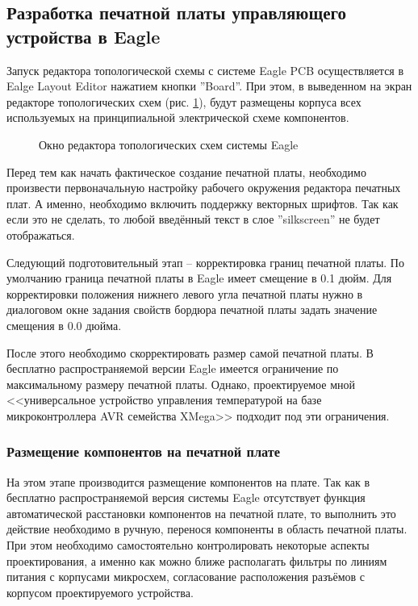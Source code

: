 \subsection{Разработка печатной платы управляющего устройства в Eagle}
Запуск редактора топологической схемы с системе Eagle PCB осуществляется в Ealge Layout Editor
нажатием кнопки ''Board''.  При этом, в выведенном на экран редакторе топологических
схем (рис. \ref{img:boardEd}), будут размещены корпуса всех используемых на принципиальной
электрической схеме компонентов. 

\begin{figure}[h]
	\caption{Окно редактора топологических схем системы Eagle}
	\label{img:boardEd}
\end{figure}

Перед тем как начать фактическое создание печатной платы, необходимо произвести
первоначальную настройку рабочего окружения редактора печатных плат. А именно, необходимо
включить поддержку векторных шрифтов. Так как если это не сделать, то любой введённый текст в
слое ''silkscreen'' не будет отображаться.

Следующий подготовительный этап -- корректировка границ печатной платы. По умолчанию граница
печатной платы в Eagle имеет смещение в 0.1 дюйм. Для корректировки положения
нижнего левого угла печатной платы нужно в диалоговом окне задания свойств бордюра
печатной платы задать значение смещения в 0.0 дюйма.

После этого необходимо скорректировать размер самой печатной платы. В
бесплатно распространяемой версии Eagle имеется ограничение по максимальному размеру
печатной платы. Однако, проектируемое мной <<универсальное устройство управления
температурой на базе микроконтроллера AVR семейства XMega>> подходит под эти ограничения.

\subsubsection{Размещение компонентов на печатной плате}
На этом этапе производится размещение компонентов на плате. Так как в
бесплатно распространяемой версия системы Eagle отсутствует функция автоматической
расстановки компонентов на печатной плате, то выполнить это действие необходимо в ручную,
перенося компоненты в область печатной платы. При этом необходимо самостоятельно
контролировать некоторые аспекты проектирования, а именно как можно ближе располагать
фильтры по линиям питания с корпусами микросхем, согласование расположения разъёмов с
корпусом проектируемого устройства.

